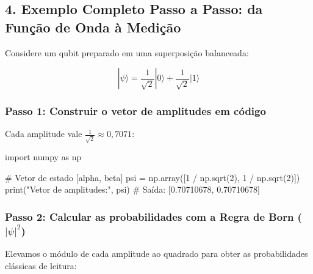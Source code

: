 \documentclass[
  brazilian,
]{report}
\newenvironment{Shaded}{\begin{snugshade}}{\end{snugshade}}
\newcommand{\BuiltInTok}[1]{\textcolor[rgb]{0.00,0.23,0.31}{#1}}
\newcommand{\CommentTok}[1]{\textcolor[rgb]{0.37,0.37,0.37}{#1}}
\newcommand{\DecValTok}[1]{\textcolor[rgb]{0.68,0.00,0.00}{#1}}
\newcommand{\ImportTok}[1]{\textcolor[rgb]{0.00,0.46,0.62}{#1}}
\newcommand{\NormalTok}[1]{\textcolor[rgb]{0.00,0.23,0.31}{#1}}
\newcommand{\OperatorTok}[1]{\textcolor[rgb]{0.37,0.37,0.37}{#1}}
\newcommand{\StringTok}[1]{\textcolor[rgb]{0.13,0.47,0.30}{#1}}
\begin{document}
\subsection{4. Exemplo Completo Passo a Passo: da Função de Onda à
Medição}\label{exemplo-completo-passo-a-passo-da-funuxe7uxe3o-de-onda-uxe0-mediuxe7uxe3o}

Considere um qubit preparado em uma superposição balanceada:

\[
|\psi\rangle = \frac{1}{\sqrt{2}}|0\rangle + \frac{1}{\sqrt{2}}|1\rangle
\]

\subsubsection{Passo 1: Construir o vetor de amplitudes em
código}\label{passo-1-construir-o-vetor-de-amplitudes-em-cuxf3digo}

Cada amplitude vale \(\frac{1}{\sqrt{2}} \approx 0{,}7071\):

\begin{Shaded}
\begin{Highlighting}[]
\ImportTok{import}\NormalTok{ numpy }\ImportTok{as}\NormalTok{ np}

\CommentTok{\# Vetor de estado [alpha, beta]}
\NormalTok{psi }\OperatorTok{=}\NormalTok{ np.array([}\DecValTok{1} \OperatorTok{/}\NormalTok{ np.sqrt(}\DecValTok{2}\NormalTok{), }\DecValTok{1} \OperatorTok{/}\NormalTok{ np.sqrt(}\DecValTok{2}\NormalTok{)])}
\BuiltInTok{print}\NormalTok{(}\StringTok{"Vetor de amplitudes:"}\NormalTok{, psi)}
\CommentTok{\# Saída: [0.70710678, 0.70710678]}
\end{Highlighting}
\end{Shaded}

\subsubsection{\texorpdfstring{Passo 2: Calcular as probabilidades com a
Regra de Born
(\(|\psi|^2\))}{Passo 2: Calcular as probabilidades com a Regra de Born (\textbar\textbackslash psi\textbar\^{}2)}}\label{passo-2-calcular-as-probabilidades-com-a-regra-de-born-psi2}

Elevamos o módulo de cada amplitude ao quadrado para obter as
probabilidades clássicas de leitura:
\end{document}
